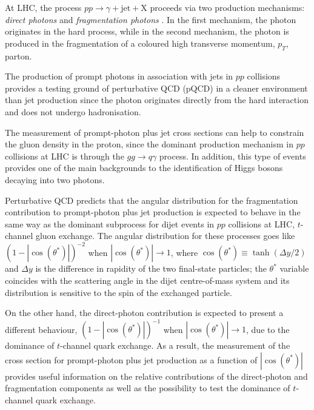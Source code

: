 \documentclass[12pt, twoside]{article}
\numberwithin{equation}{section}
\numberwithin{figure}{section}
\begin{document}
At LHC, the process $pp \rightarrow{} \gamma + \text{jet} + \text{X}$ proceeds via two production mechanisms: \textit{direct photons} \cite{directPhoton} and \textit{fragmentation photons} \cite{fragmentation}. In the first mechanism, the photon originates in the hard process, while in the second mechanism, the photon is produced in the fragmentation of a coloured high transverse momentum, $p_{T}$, parton.

The production of prompt photons in association with jets in $pp$ collisions provides a testing ground of perturbative QCD \cite{testQCD} (pQCD) in a cleaner environment than jet production since the photon originates directly from the hard interaction and does not undergo hadronisation.

The measurement of prompt-photon plus jet cross sections can help to constrain the gluon density in the proton, since the dominant production mechanism in $pp$ collisions at LHC is through the $gg \rightarrow{} q\gamma$ process. In addition, this type of events provides one of the main backgrounds to the identification of Higgs bosons decaying into two photons.

Perturbative QCD predicts that the angular distribution for the fragmentation contribution to prompt-photon plus jet production is expected to behave in the same way as the dominant subprocess for dijet events in $pp$ collisions at LHC, $t$-channel gluon exchange. The angular distribution for these processes goes like $(1 - \left|\cos(\theta^{*})\right|)^{-2}$ when $\left|\cos(\theta^{*})\right| \rightarrow{} 1$, where $\cos(\theta^{*}) \equiv \tanh(\Delta y/2)$ and $\Delta y$ is the difference in rapidity of the two final-state particles; the $\theta^{*}$ variable coincides with the scattering angle in the dijet centre-of-mass system and its distribution is sensitive to the spin of the exchanged particle.

On the other hand, the direct-photon contribution is expected to present a different behaviour, $(1-\left|\cos(\theta^{*})\right|)^{-1}$ when $\left|\cos(\theta^{*})\right| \rightarrow{} 1$, due to the dominance of $t$-channel quark exchange. As a result, the measurement of the cross section for prompt-photon plus jet production as a function of $\left|\cos(\theta^{*})\right|$ provides useful information on the relative contributions of the direct-photon and fragmentation components as well as the possibility to test the dominance of $t$-channel quark exchange.
\end{document}
